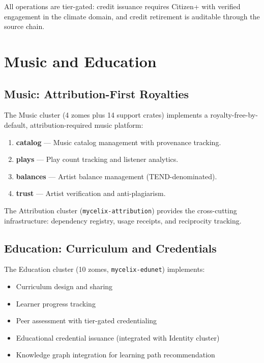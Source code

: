 \documentclass[12pt]{book}
\begin{document}
All operations are tier-gated: credit issuance requires Citizen+
with verified engagement in the climate domain, and credit retirement is
auditable through the source chain.


\chapter{Music and Education}

\section{Music: Attribution-First Royalties}

The Music cluster (4 zomes plus 14 support crates) implements a
royalty-free-by-default, attribution-required music platform:

\begin{enumerate}
  \item \textbf{catalog} --- Music catalog management with provenance tracking.
  \item \textbf{plays} --- Play count tracking and listener analytics.
  \item \textbf{balances} --- Artist balance management (TEND-denominated).
  \item \textbf{trust} --- Artist verification and anti-plagiarism.
\end{enumerate}

The Attribution cluster (\texttt{mycelix-attribution}) provides the cross-cutting
infrastructure: dependency registry, usage receipts, and reciprocity tracking.

\section{Education: Curriculum and Credentials}

The Education cluster (10 zomes, \texttt{mycelix-edunet}) implements:

\begin{itemize}
  \item Curriculum design and sharing
  \item Learner progress tracking
  \item Peer assessment with tier-gated credentialing
  \item Educational credential issuance (integrated with Identity cluster)
  \item Knowledge graph integration for learning path recommendation
\end{itemize}
\end{document}
